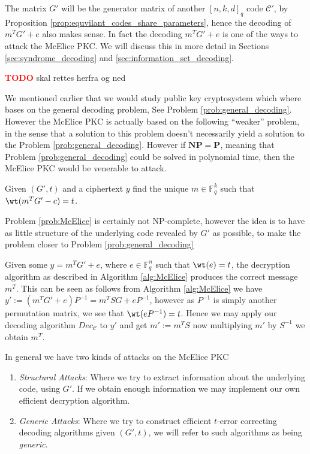 \begin{remark}
  The matrix $G'$ will be the generator matrix of another $[n, k, d]_{q}$ code $\mathcal{C}'$, by Proposition \ref{prop:equvilant_codes_share_parameters}, hence the decoding of $m^T G' + e$ also makes sense. In fact the decoding $m^T G' + e$ is one of the ways to attack the McElice PKC. We will discuss this in more detail in Sections \ref{sec:syndrome_decoding} and \ref{sec:information_set_decoding}.
\end{remark}

\textcolor{red}{\textbf{TODO}} skal rettes herfra og ned

We mentioned earlier that we would study public key cryptosystem which where bases on the general decoding problem, See Problem \ref{prob:general_decoding}. However the McElice PKC is actually based on the following ``weaker'' problem, in the sense that a solution to this problem doesn't necessarily yield a solution to the Problem \ref{prob:general_decoding}. However if $\mathbf{NP} = \mathbf{P}$, meaning that Problem \ref{prob:general_decoding} could be solved in polynomial time, then the McElice PKC would be venerable to attack.
\begin{problem}\label{prob:McElice}
  Given $(G', t)$ and a ciphertext $y$ find the unique $m \in \mathbb{F}_q^{k}$ such that $\wt(m^{T}G' - c) = t$.
\end{problem}
Problem \ref{prob:McElice} is certainly not NP-complete, however the idea is to have as little structure of the underlying code revealed by $G'$ as possible, to make the problem closer to Problem \ref{prob:general_decoding}

\begin{remark}\label{rem:decryption_algorithm_produces_correct_message}
   Given some $y = m^{T}G' + e$, where $e \in \mathbb{F}_q^{n}$ such that $\wt(e) = t$, the decryption algorithm as described in Algorithm \ref{alg:McElice} produces the correct message $m^{T}$. This can be seen as follows from Algorithm \ref{alg:McElice} we have $y' := (m^{T} G' + e) P^{-1} = m^{T}SG + e P^{-1}$, however as $P^{-1}$ is simply another permutation matrix, we see that $\wt(eP^{-1}) = t$. Hence we may apply our decoding algorithm $Dec_{\mathcal{C}}$ to $y'$ and get $m' := m^{T}S$ now multiplying $m'$ by $S^{-1}$ we obtain $m^{T}$.
\end{remark}

In general we have two kinds of attacks on the McElice PKC
\begin{enumerate}
    \item \textit{Structural Attacks}: Where we try to extract information about the underlying code, using $G'$. If we obtain enough information we may implement our own efficient decryption algorithm.
    \item \textit{Generic Attacks}: Where we try to construct efficient $t$-error correcting decoding algorithms given $(G', t)$, we will refer to such algorithms as being \textit{generic}.
\end{enumerate}

